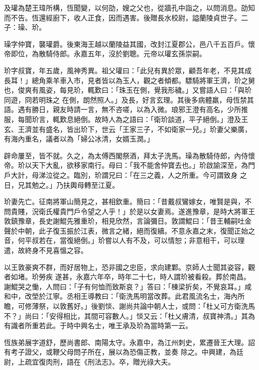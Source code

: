 \begin{pinyinscope}
 及瓘為楚王瑋所構，恆聞變，以何劭，嫂之父也，從牆孔中詣之，以問消息。劭知而不告。恆還經廚下，收人正食，因而遇害。後贈長水校尉，謚蘭陵貞世子。二子：璪、玠。



 璪字仲寶，襲瓘爵。後東海王越以蘭陵益其國，改封江夏郡公，邑八千五百戶。懷帝即位，為散騎侍郎。永嘉五年，沒於劉聰。元帝以瓘玄孫崇嗣。



 玠字叔寶，年五歲，風神秀異。祖父瓘曰：「此兒有異於眾，顧吾年老，不見其成長耳！」總角乘羊車入市，見者皆以為玉人，觀之者傾都。驃騎將軍王濟，玠之舅也，俊爽有風姿，每見玠，輒歎曰：「珠玉在側，覺我形穢。」又嘗語人曰：「與玠同遊，冏若明珠之
 在側，朗然照人。」及長，好言玄理。其後多病體羸，母恆禁其語。遇有勝日，親友時請一言，無不咨嗟，以為入微。琅邪王澄有高名，少所推服，每聞玠言，輒歎息絕倒。故時人為之語曰：「衛玠談道，平子絕倒。」澄及王玄、王濟並有盛名，皆出玠下，世云「王家三子，不如衛家一兒。」玠妻父樂廣，有海內重名，議者以為「婦公冰清，女婿玉潤。」



 辟命屢至，皆不就。久之，為太傅西閣祭酒，拜太子洗馬。璪為散騎侍郎，內侍懷帝。玠以天下大亂，欲移家南行。母曰：「我不能舍仲寶去也。」玠啟諭深至，為門戶大計，母涕泣從之。臨別，玠謂兄曰：「在三之義，人之所重。今可謂致身
 之日，兄其勉之。」乃扶輿母轉至江夏。



 玠妻先亡。征南將軍山簡見之，甚相欽重。簡曰：「昔戴叔鸞嫁女，唯賢是與，不問貴賤，況衛氏權貴門戶令望之人乎！」於是以女妻焉。遂進豫章，是時大將軍王敦鎮豫章，長史謝鯤先雅重玠，相見欣然，言論彌日。敦謂鯤曰：「昔王輔嗣吐金聲於中朝，此子復玉振於江表，微言之緒，絕而復續。不意永嘉之末，復聞正始之音，何平叔若在，當復絕倒。」玠嘗以人有不及，可以情恕；非意相干，可以理遣，故終身不見喜慍之容。



 以王敦豪爽不群，而好居物上，恐非國之忠臣，求向建鄴。京師人士聞其姿容，觀者如堵。玠勞疾
 遂甚，永嘉六年卒，時年二十七，時人謂玠被看殺。葬於南昌。謝鯤哭之慟，人問曰：「子有何恤而致斯哀？」答曰：「棟梁折矣，不覺哀耳。」咸和中，改塋於江寧。丞相王導教曰：「衛洗馬明當改葬。此君風流名士，海內所瞻，可修薄祭，以敦舊好。」後劉惔、謝尚共論中朝人士，或問：「杜乂可方衛洗馬不？」尚曰：「安得相比，其間可容數人。」惔又云：「杜乂膚清，叔寶神清。」其為有識者所重若此。于時中興名士，唯王承及玠為當時第一云。



 恆族弟展字道舒，歷尚書郎、南陽太守。永嘉中，為江州刺史，累遷晉王大理。詔有考子證父，或鞭父母問子所在，展以為恐傷正教，並奏
 除之。中興建，為廷尉，上疏宜復肉刑，語在《刑法志》。卒，贈光祿大夫。




\end{pinyinscope}
